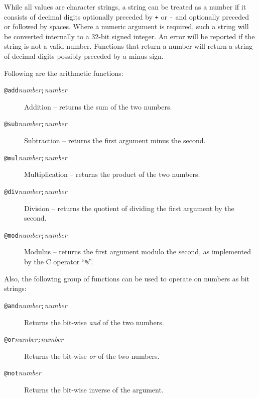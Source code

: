 While all values are character strings, a string can be treated as a
number if it consists of decimal digits optionally preceded by \verb/+/
or \verb/-/ and optionally preceded or followed by spaces.  Where a
numeric argument is required, such a string will be converted internally
to a 32-bit signed integer.  An error will be reported if the string is
not a valid number.
Functions that return a number will return a
string of decimal digits possibly preceded by a minus sign.

Following are the arithmetic functions:
\begin{description}
\item[{\tt @add\ttlb}{\it number}{\tt ;}{\it number}{\tt \ttrb}]
Addition -- returns the sum of the two numbers.
\item[{\tt @sub\ttlb}{\it number}{\tt ;}{\it number}{\tt \ttrb}]
Subtraction -- returns the first argument minus the second.
\item[{\tt @mul\ttlb}{\it number}{\tt ;}{\it number}{\tt \ttrb}]
Multiplication -- returns the product of the two numbers.
\item[{\tt @div\ttlb}{\it number}{\tt ;}{\it number}{\tt \ttrb}]
Division -- returns the quotient of dividing the first argument by the second.
\item[{\tt @mod\ttlb}{\it number}{\tt ;}{\it number}{\tt \ttrb}]
Modulus -- returns the first argument modulo the second, as implemented by
the C operator ``\verb/%/''.
\end{description}

Also, the following group of functions can be used to operate on numbers
as bit strings:
\begin{description}
\item[{\tt @and\ttlb}{\it number}{\tt ;}{\it number}{\tt \ttrb}]
Returns the bit-wise {\it and} of the two numbers.
\item[{\tt @or\ttlb}{\it number}{\tt ;}{\it number}{\tt \ttrb}]
Returns the bit-wise {\it or} of the two numbers.
\item[{\tt @not\ttlb}{\it number}{\tt \ttrb}]
Returns the bit-wise inverse of the argument.
\end{description}

